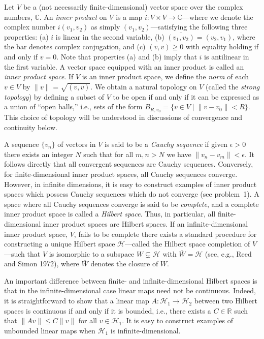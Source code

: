 Let \(V\) be a (not necessarily finite-dimensional) vector space over the complex
numbers, \(\mathbb C\). An \emph{inner product} on \(V\) is a map
\(i:V\times V\longrightarrow\mathbb C\)---where we denote the complex number
\(i(v_1,v_2)\) as simply \((v_1,v_2)\)---satisfying the following three properties:
(a) \(i\) is linear in the second variable, (b)
\(\overline{(v_1,v_2)}=(v_2,v_1)\), where the bar denotes complex conjugation,
and (c) \((v,v)\geq 0\) with equality holding if and only if \(v=0\). Note that
properties (a) and (b) imply that \(i\) is antilinear in the first variable. A vector
space equipped with an inner product is called an \emph{inner product space}. If
\(V\) is an inner product space, we define the \emph{norm} of each \(v\in V\) by
\(\lVert v\rVert=\sqrt{(v,v)}\). We obtain a natural topology on \(V\) (called the
\emph{strong topology}) by defining a subset of \(V\) to be open if and only if it can
be expressed as a union of ``open balls,'' i.e., sets of the form
\(B_{R,v_0}=\{v\in V\mid \lVert v-v_0\rVert<R\}\). This choice of topology will
be understood in discussions of convergence and continuity below.

A sequence \(\{v_n\}\) of vectors in \(V\) is said to be a \emph{Cauchy sequence}
if given \(\epsilon>0\) there exists an integer \(N\) such that for all \(m,n>N\) we
have \(\lVert v_n-v_m\rVert<\epsilon\). It follows directly that all convergent
sequences are Cauchy sequences. Conversely, for finite-dimensional inner product
spaces, all Cauchy sequences converge. However, in infinite dimensions, it is easy to
construct examples of inner product spaces which possess Cauchy sequences which do
not converge (see problem~1). A space where all Cauchy sequences converge is said
to be \emph{complete}, and a complete inner product space is called a \emph{Hilbert
space}. Thus, in particular, all finite-dimensional inner product spaces are Hilbert
spaces. If an infinite-dimensional inner product space, \(V\), fails to be complete
there exists a standard procedure for constructing a unique Hilbert space
\(\mathcal H\)---called the Hilbert space completion of \(V\)---such that \(V\) is
isomorphic to a subspace \(W\subsetneq\mathcal H\) with
\(\overline W=\mathcal H\) (see, e.g., Reed and Simon 1972), where
\(\overline W\) denotes the closure of \(W\).

An important difference between finite- and infinite-dimensional Hilbert spaces is
that in the infinite-dimensional case linear maps need not be continuous. Indeed, it
is straightforward to show that a linear map
\(A:\mathcal H_1\longrightarrow\mathcal H_2\) between two Hilbert spaces is
continuous if and only if it is bounded, i.e., there exists a \(C\in\mathbb R\) such
that \(\lVert Av\rVert\leq C\lVert v\rVert\) for all \(v\in\mathcal H_1\). It is
easy to construct examples of unbounded linear maps when \(\mathcal H_1\) is
infinite-dimensional.

